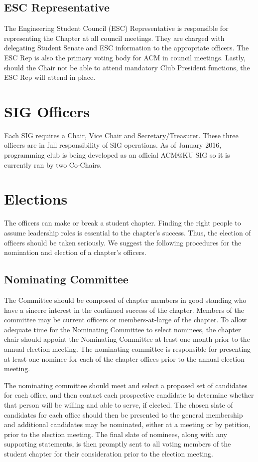 \subsection*{ESC Representative}
The Engineering Student Council (ESC) Representative is responsible for
representing the Chapter at all council meetings. They are charged with
delegating Student Senate and ESC information to the appropriate officers.
The ESC Rep is also the primary voting body for ACM in council meetings. Lastly,
should the Chair not be able to attend mandatory \“Club President\” functions,
the ESC Rep will attend in place.

\section*{SIG Officers}
Each SIG requires a Chair, Vice Chair and Secretary/Treasurer. These three
officers are in full responsibility of SIG operations. As of January 2016,
programming club is being developed as an official ACM@KU SIG so it is currently
ran by two Co-Chairs.

\section{Elections}

The officers can make or break a student chapter. Finding the right people to
assume leadership roles is essential to the chapter's success. Thus, the
election of officers should be taken seriously. We suggest the following
procedures for the nomination and election of a chapter's officers.

\subsection*{Nominating Committee}
The Committee should be composed of chapter members in good standing who have a
sincere interest in the continued success of the chapter. Members of the
committee may be current officers or members-at-large of the chapter. To allow
adequate time for the Nominating Committee to select nominees, the chapter chair
should appoint the Nominating Committee at least one month prior to the annual
election meeting. The nominating committee is responsible for presenting at
least one nominee for each of the chapter offices prior to the annual election
meeting.

The nominating committee should meet and select a proposed set of candidates for
each office, and then contact each prospective candidate to determine whether
that person will be willing and able to serve, if elected. The chosen slate of
candidates for each office should then be presented to the general membership
and additional candidates may be nominated, either at a meeting or by petition,
prior to the election meeting. The final slate of nominees, along with any
supporting statements, is then promptly sent to all voting members of the
student chapter for their consideration prior to the election meeting.


